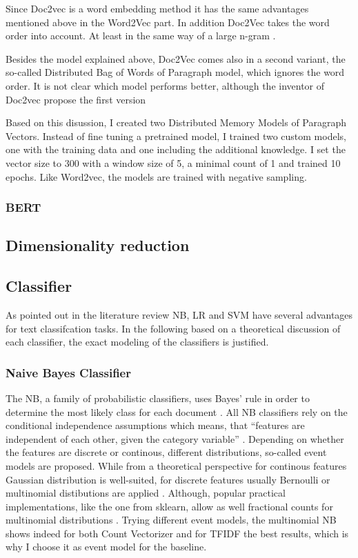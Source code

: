 \documentclass[12pt, a4paper, titlepage]{article}
\begin{document}
Since Doc2vec is a word embedding method it has the same advantages mentioned above in the Word2Vec part. In addition Doc2Vec takes the word order into account. At least in the same way of a large n-gram \citep{le2014}. 

Besides the model explained above, Doc2Vec comes also in a second variant, the so-called Distributed Bag of Words of Paragraph model, which ignores the word order. It is not clear which model performs better, although the inventor of Doc2vec propose the first version \citep{lau2016}

Based on this disussion, I created two Distributed Memory Models of Paragraph Vectors. Instead of fine tuning a pretrained model, I trained two custom models, one with the training data and one including the additional knowledge. I set the vector size to 300 with a window size of 5, a minimal count of 1 and trained 10 epochs. Like Word2vec, the models are trained with negative sampling.  

\subsubsection{BERT}

\subsection{Dimensionality reduction}

\subsection{Classifier}
As pointed out in the literature review \ac{NB}, \ac{LR} and \ac{SVM} have several advantages for text classifcation tasks. In the following based on a theoretical discussion of each classifier, the exact modeling of the classifiers is justified. 

\subsubsection{Naive Bayes Classifier}
The \ac{NB}, a family of probabilistic classifiers, uses Bayes' rule in order to determine the most likely class for each document \citep{Schneider2005}. All \ac{NB} classifiers rely on the conditional independence assumptions which means, that ``features are independent of each other, given the category variable'' \citep[48]{Xu2018}. Depending on whether the features are discrete or continous, different distributions, so-called event models are proposed. While from a theoretical perspective for continous features Gaussian distribution is well-suited, for discrete features usually Bernoulli or multinomial distibutions are applied \citep{Xu2018}. Although, popular practical implementations, like the one from sklearn, allow as well fractional counts for multinomial distributions \citep{scikit-learn}. Trying different event models, the multinomial \ac{NB} shows indeed for both Count Vectorizer and for TFIDF the best results, which is why I choose it as event model for the baseline. 
\end{document}
